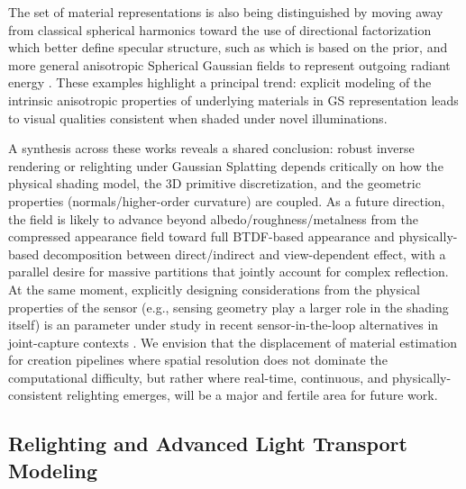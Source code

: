 \documentclass[11pt,a4paper]{article}
\begin{document}
The set of material representations is also being distinguished by moving away from classical spherical harmonics toward the use of directional factorization which better define specular structure, such as \cite{arxiv:2412.00905v2} which is based on the \cite{arxiv:2502.09039v1} prior, and more general anisotropic Spherical Gaussian fields to represent outgoing radiant energy \cite{arxiv:2402.15870v1}. These examples highlight a principal trend: explicit modeling of the intrinsic anisotropic properties of underlying materials in GS representation leads to visual qualities consistent when shaded under novel illuminations.

A synthesis across these works reveals a shared conclusion: robust inverse rendering or relighting under Gaussian Splatting depends critically on how the physical shading model, the 3D primitive discretization, and the geometric properties (normals/higher-order curvature) are coupled. As a future direction, the field is likely to advance beyond albedo/roughness/metalness from the compressed appearance field toward full BTDF-based appearance and physically-based decomposition between direct/indirect and view-dependent effect, with a parallel desire for massive \cite{arxiv:2512.14180v2} partitions that jointly account for complex reflection. At the same moment, explicitly designing considerations from the physical properties of the sensor (e.g., sensing geometry play a larger role in the shading itself) is an parameter under study in recent sensor-in-the-loop alternatives in joint-capture contexts \cite{arxiv:2410.05111v3,arxiv:2411.16816v3}. We envision that the displacement of material estimation for creation pipelines where spatial resolution does not dominate the computational difficulty, but rather where real-time, continuous, and physically-consistent relighting emerges, will be a major and fertile area for future work.


\subsection{Relighting and Advanced Light Transport Modeling}
\end{document}
